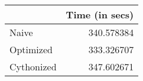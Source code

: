\begin{tabular}{lr}
\toprule
{} &  Time (in secs) \\
\midrule
Naive      &      340.578384 \\
Optimized  &      333.326707 \\
Cythonized &      347.602671 \\
\bottomrule
\end{tabular}
